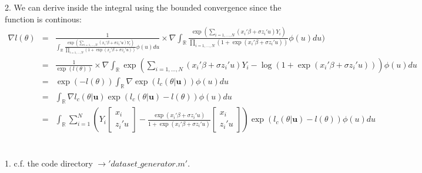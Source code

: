 2.  We can derive inside the integral using the bounded convergence since the function is continous:
\begin{eqnarray*}
	\nabla l(\theta)&=& \frac{1}{\int_{\mathbb{R}} \frac{\exp(\sum_{i=1,\dots,N}(x_i' \beta + \sigma z_i'u) Y_i)}{\prod_{i=1,\dots,N}(1+\exp(x_i' \beta + \sigma z_i'u))} \phi(u) du} \times \nabla \int_{\mathbb{R}} \frac{\exp(\sum_{i=1,\dots,N}(x_i' \beta + \sigma z_i'u) Y_i)}{\prod_{i=1,\dots,N}(1+\exp(x_i' \beta + \sigma z_i'u))} \phi(u) du)\\
						&=& \frac{1}{\exp(l(\theta))}\times \nabla \int_{\mathbb{R}} \exp(\sum_{i=1,\dots,N}(x_i' \beta + \sigma z_i'u) Y_i-\log(1+\exp(x_i' \beta + \sigma z_i'u)))\phi(u)du \\
						&=& \exp(-l(\theta)) \int_{\mathbb{R}} \nabla \exp(l_c(\theta\vert \textbf{u})) \phi(u) du\\
						&=& \int_{\mathbb{R}} \nabla l_c(\theta\vert \textbf{u}) \exp (l_c(\theta\vert \textbf{u})-l(\theta)) \phi(u)du\\
						&=& \int_{\mathbb{R}} \sum_{i=1}^{N} (Y_i\begin{bmatrix}
							x_i\\
							z_i'u
						\end{bmatrix}-\frac{\exp(x_i' \beta + \sigma z_i'u)}{1+\exp(x_i' \beta + \sigma z_i'u)}\begin{bmatrix}
						x_i\\
						z_i'u
					\end{bmatrix}) \exp (l_c(\theta\vert \textbf{u})-l(\theta)) \phi(u)du\\
\end{eqnarray*}




~\\

1. c.f. the code directory $\rightarrow 'dataset\_generator.m'$.\\
	

